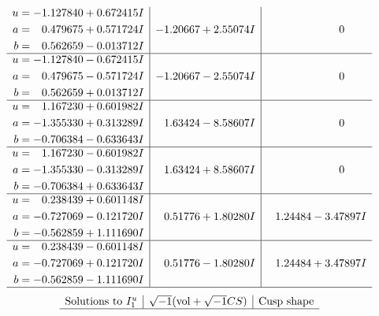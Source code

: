 \documentclass[1p]{elsarticle_modified}
\theoremstyle{definition}
\newcommand{\I}{\sqrt{-1}}
\begin{document}
$$\begin{array}{c|c|c}
\begin{aligned}
u &= -1.127840 + 0.672415 I \\
a &= \phantom{-}0.479675 + 0.571724 I \\
b &= \phantom{-}0.562659 - 0.013712 I\end{aligned}
 & -1.20667 + 2.55074 I & \phantom{-0.000000 } 0 \\ \hline\begin{aligned}
u &= -1.127840 - 0.672415 I \\
a &= \phantom{-}0.479675 - 0.571724 I \\
b &= \phantom{-}0.562659 + 0.013712 I\end{aligned}
 & -1.20667 - 2.55074 I & \phantom{-0.000000 } 0 \\ \hline\begin{aligned}
u &= \phantom{-}1.167230 + 0.601982 I \\
a &= -1.355330 + 0.313289 I \\
b &= -0.706384 - 0.633643 I\end{aligned}
 & \phantom{-}1.63424 - 8.58607 I & \phantom{-0.000000 } 0 \\ \hline\begin{aligned}
u &= \phantom{-}1.167230 - 0.601982 I \\
a &= -1.355330 - 0.313289 I \\
b &= -0.706384 + 0.633643 I\end{aligned}
 & \phantom{-}1.63424 + 8.58607 I & \phantom{-0.000000 } 0 \\ \hline\begin{aligned}
u &= \phantom{-}0.238439 + 0.601148 I \\
a &= -0.727069 - 0.121720 I \\
b &= -0.562859 + 1.111690 I\end{aligned}
 & \phantom{-}0.51776 + 1.80280 I & \phantom{-}1.24484 - 3.47897 I \\ \hline\begin{aligned}
u &= \phantom{-}0.238439 - 0.601148 I \\
a &= -0.727069 + 0.121720 I \\
b &= -0.562859 - 1.111690 I\end{aligned}
 & \phantom{-}0.51776 - 1.80280 I & \phantom{-}1.24484 + 3.47897 I\\
 \hline 
 \end{array}$$\newpage$$\begin{array}{c|c|c}  
\text{Solutions to }I^u_{1}& \I (\text{vol} + \sqrt{-1}CS) & \text{Cusp shape}\\
 \hline 

\end{array}$$
\end{document}
